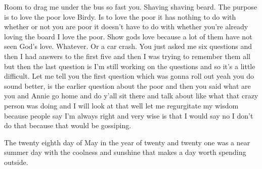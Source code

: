 \documentclass{article}
\date{\today}
\begin{document}
\maketitle

\begin{multicols}{3}

 
Room to drag me under the bus so fast you. Shaving shaving beard.  The purpose is to love the poor love Birdy.  Is to love the poor it has nothing to do with whether or not you are poor it doesn't have to do with whether you're already loving the board I love the poor.  Show gods love because a lot of them have not seen God's love.  Whatever. Or a car crash.  
You just asked me six questions and then I had answers to the first five and then I was trying to remember them all but then the last question is I'm still working on the questions and so it's a little difficult.  Let me tell you the first question which was gonna roll out yeah you do sound better, is the earlier question about the poor and then you said what are you and Annie go home and do y'all sit there and talk about like what that crazy person was doing and I will look at that well let me regurgitate my wisdom because people say I'm always right and very wise is that I would say no I don't do that because that would be gossiping.  


The twenty eighth day of May in the year of twenty and twenty one was a near summer day with the coolness and sunshine that makes a day worth spending outside.  





\end{multicols}
\end{document}

